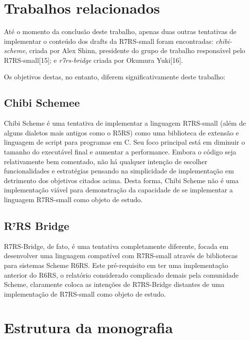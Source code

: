 \section{Trabalhos relacionados}
\label{sec:trabalhos_relacionados}

Até o momento da conclusão deste trabalho, apenas duas outras tentativas de
implementar o conteúdo dos drafts da \acs{R7RS}-small foram encontradas:
\textit{chibi-scheme}, criada por Alex Shinn, presidente do grupo de trabalho
responsável pelo \acs{R7RS}-small[15]; e \textit{r7rs-bridge} criada por
Okumura Yuki[16].

Os objetivos destas, no entanto, diferem significativamente deste trabalho:

\subsection{Chibi Schemee}
\label{sub:chibi_scheme}

Chibi Scheme é uma tentativa de implementar a linguagem R7RS-small (além de
alguns dialetos mais antigos como o R5RS) como uma biblioteca de extensão e
linguagem de script para programas em C. Seu foco principal está em diminuir o
tamanho do executável final e aumentar a performance. Embora o código seja
relativamente bem comentado, não há qualquer intenção de escolher
funcionalidades e estratégias pensando na simplicidade de implementação em
detrimento dos objetivos citados acima. Desta forma, Chibi Scheme não é uma
implementação viável para demonstração da capacidade de se implementar a
linguagem R7RS-small como objeto de estudo.


\subsection{R⁷RS Bridge}
\label{sub:r7rs_bridge}

R7RS-Bridge, de fato, é uma tentativa completamente diferente, focada em
desenvolver uma linguagem compatível com R7RS-small através de bibliotecas para
sistemas Scheme R6RS. Este pré-requisito em ter uma implementação anterior do
R6RS, o relatório considerado complicado demais pela comunidade Scheme,
claramente coloca as intenções de R7RS-Bridge distantes de uma implementação de
R7RS-small como objeto de estudo.

\section{Estrutura da monografia}
\label{sec:estrutura_da_monografia}

